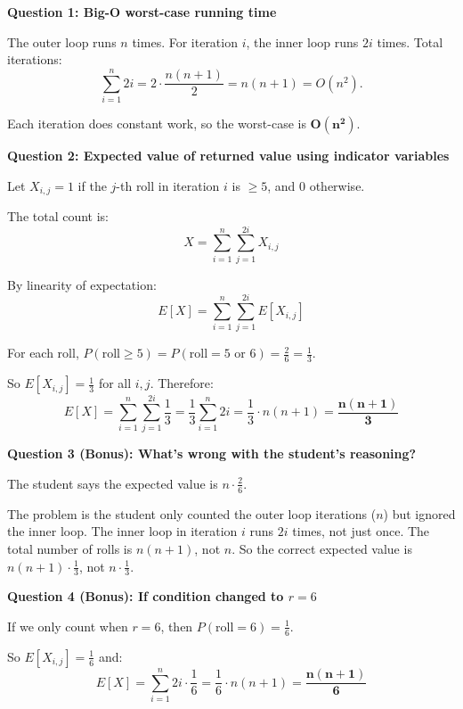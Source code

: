 \documentclass{article}
\theoremstyle{theorem}
\theoremstyle{definition}
\theoremstyle{remark}
\begin{document}
\vspace{0.3cm}

\textbf{Question 1: Big-O worst-case running time}

The outer loop runs $n$ times. For iteration $i$, the inner loop runs $2i$ times. Total iterations:
\[
\sum_{i=1}^{n} 2i = 2 \cdot \frac{n(n+1)}{2} = n(n+1) = O(n^2).
\]

Each iteration does constant work, so the worst-case is $\mathbf{O(n^2)}$.

\vspace{0.3cm}

\textbf{Question 2: Expected value of returned value using indicator variables}

Let $X_{i,j} = 1$ if the $j$-th roll in iteration $i$ is $\geq 5$, and $0$ otherwise.

The total count is:
\[
X = \sum_{i=1}^{n} \sum_{j=1}^{2i} X_{i,j}
\]

By linearity of expectation:
\[
E[X] = \sum_{i=1}^{n} \sum_{j=1}^{2i} E[X_{i,j}]
\]

For each roll, $P(\text{roll} \geq 5) = P(\text{roll} = 5 \text{ or } 6) = \frac{2}{6} = \frac{1}{3}$.

So $E[X_{i,j}] = \frac{1}{3}$ for all $i, j$. Therefore:
\[
E[X] = \sum_{i=1}^{n} \sum_{j=1}^{2i} \frac{1}{3} = \frac{1}{3} \sum_{i=1}^{n} 2i = \frac{1}{3} \cdot n(n+1) = \mathbf{\frac{n(n+1)}{3}}
\]

\vspace{0.3cm}

\textbf{Question 3 (Bonus): What's wrong with the student's reasoning?}

The student says the expected value is $n \cdot \frac{2}{6}$.

The problem is the student only counted the outer loop iterations ($n$) but ignored the inner loop. The inner loop in iteration $i$ runs $2i$ times, not just once. The total number of rolls is $n(n+1)$, not $n$. So the correct expected value is $n(n+1) \cdot \frac{1}{3}$, not $n \cdot \frac{1}{3}$.

\vspace{0.3cm}

\textbf{Question 4 (Bonus): If condition changed to $r = 6$}

If we only count when $r = 6$, then $P(\text{roll} = 6) = \frac{1}{6}$.

So $E[X_{i,j}] = \frac{1}{6}$ and:
\[
E[X] = \sum_{i=1}^{n} 2i \cdot \frac{1}{6} = \frac{1}{6} \cdot n(n+1) = \mathbf{\frac{n(n+1)}{6}}
\]
\end{document}

